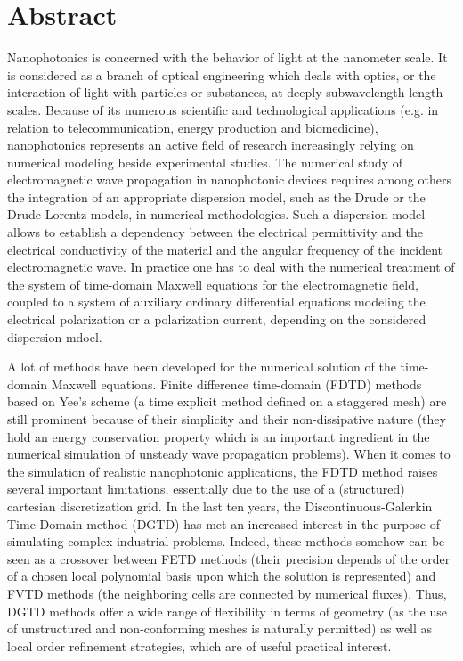 \documentclass[article,A4,11pt]{llncs}%
\begin{document}
\section*{Abstract}
Nanophotonics is concerned with the behavior of light at the nanometer
scale.   It is  considered as  a branch  of optical  engineering which
deals  with optics,  or the  interaction  of light  with particles  or
substances,  at deeply  subwavelength length  scales.  Because  of its
numerous scientific and  technological applications (e.g.  in relation
to    telecommunication,   energy    production    and   biomedicine),
nanophotonics  represents  an active  field  of research  increasingly
relying  on  numerical  modeling  beside  experimental  studies.   The
numerical  study of electromagnetic  wave propagation  in nanophotonic
devices  requires  among  others  the integration  of  an  appropriate
dispersion model,  such as the  Drude or the Drude-Lorentz  models, in
numerical methodologies.  Such a  dispersion model allows to establish
a dependency  between the  electrical permittivity and  the electrical
conductivity of the material and the angular frequency of the incident
electromagnetic wave.  In practice one  has to deal with the numerical
treatment  of the  system  of time-domain  Maxwell  equations for  the
electromagnetic  field,  coupled to  a  system  of auxiliary  ordinary
differential  equations  modeling  the  electrical polarization  or  a
polarization current, depending on the considered dispersion mdoel.

A lot of methods have been developed for the numerical solution of the
time-domain Maxwell  equations.  Finite difference  time-domain (FDTD)
methods based  on Yee's  scheme (a time  explicit method defined  on a
staggered mesh)  are still prominent  because of their  simplicity and
their  non-dissipative  nature   (they  hold  an  energy  conservation
property which is an  important ingredient in the numerical simulation
of  unsteady  wave  propagation  problems).   When  it  comes  to  the
simulation  of realistic  nanophotonic applications,  the  FDTD method
raises several important limitations, essentially  due to the use of a
(structured) cartesian  discretization grid.   In the last  ten years,
the  Discontinuous-Galerkin  Time-Domain  method  (DGTD)  has  met  an
increased  interest in  the purpose  of simulating  complex industrial
problems.  Indeed,  these methods somehow  can be seen as  a crossover
between FETD methods (their precision depends of the order of a chosen
local  polynomial basis upon  which the  solution is  represented) and
FVTD  methods  (the  neighboring  cells  are  connected  by  numerical
fluxes).   Thus, DGTD  methods offer  a wide  range of  flexibility in
terms  of geometry  (as  the use  of  unstructured and  non-conforming
meshes  is naturally  permitted)  as well  as  local order  refinement
strategies, which are of useful practical interest.
\end{document}
